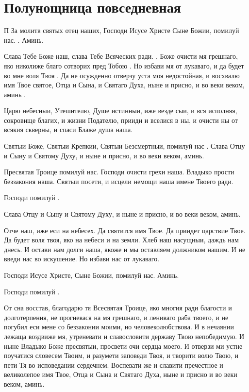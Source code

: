 \section{Полунощница повседневная}\begin{mymulticols}



    \lettrine{П}{} За молитв святых отец наших, Господи Исусе Христе Сыне Божии, помилуй нас. . Аминь. 


Слава Тебе Боже наш, слава Тебе Всяческих ради. . Боже очисти мя грешнаго, яко николиже благо сотворих пред Тобою . Но избави мя от лукаваго, и да будет во мне воля Твоя . Да не осужденно отверзу уста моя недостойная, и восхвалю имя Твое святое, Отца и Сына, и Святаго Духа, ныне и присно, и во веки веком, аминь . 

Царю небесныи, Утешителю, Душе истинныи, иже везде сыи, и вся исполняя, сокровище благих, и жизни Подателю, прииди и вселися в ны, и очисти ны от всякия скверны, и спаси Блаже душа наша. 

Святыи Боже, Святыи Крепкии, Святыи Безсмертныи, помилуй нас . Слава Отцу и Сыну и Святому Духу, и ныне и присно, и во веки веком, аминь. 

Пресвятая Троице помилуй нас. Господи очисти грехи наша. Владыко прости беззакония наша. Святыи посети, и исцели немощи наша имене Твоего ради. 

Господи помилуй . 

Слава Отцу и Сыну и Святому Духу, и ныне и присно, и во веки веком, аминь. 

Отче наш, иже еси на небесех. Да святится имя Твое. Да приидет царствие Твое. Да будет воля твоя, яко на небеси и на земли. Хлеб наш насущныи, даждь нам днесь. И остави нам долги наша, якоже и мы оставляем должником нашим. И не введи нас во искушение. Но избави нас от лукаваго. 

Господи Исусе Христе, Сыне Божии, помилуй нас. Аминь. 

Господи помилуй . 

 От сна восстав, благодарю тя Всесвятая Троице, яко многия ради благости и долготерпения, не прогневася на мя грешнаго, и лениваго раба твоего, и не погубил еси мене со беззаконии моими, но человеколюбствова. И в нечаянии лежаща воздвиже мя, утреневати и славословити державу Твою непобедимую. И ныне Владыко Боже пресвятыи, просвети очи сердца моего. И отверзи ми устне поучатися словесем Твоим, и разумети заповеди Твоя, и творити волю Твою, и пети Тя во исповедании сердечнем. Воспевати же и славити пречестное и великолепое имя Твое, Отца и Сына и Святаго Духа, ныне и присно и во веки веком, аминь. 


\end{mymulticols}
